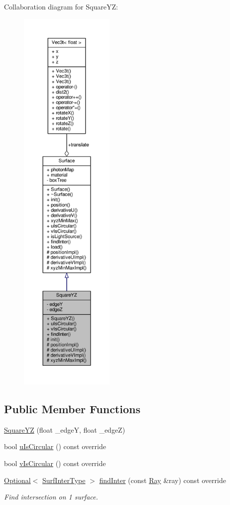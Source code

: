 Collaboration diagram for Square\+YZ\+:\nopagebreak
\begin{figure}[H]
\begin{center}
\leavevmode
\includegraphics[height=550pt]{classSquareYZ__coll__graph}
\end{center}
\end{figure}
\subsection*{Public Member Functions}
\begin{DoxyCompactItemize}
\item 
\hyperlink{classSquareYZ_a3d88bfd27f8d9a833a54ef3d2d885831}{Square\+YZ} (float \+\_\+edgeY, float \+\_\+edgeZ)
\item 
bool \hyperlink{classSquareYZ_adc74593250e7aaf7f8d733e22e3951b6}{u\+Is\+Circular} () const override
\item 
bool \hyperlink{classSquareYZ_ab6a94e65acedccedd4556023b1490841}{v\+Is\+Circular} () const override
\item 
\hyperlink{classOptional}{Optional}$<$ \hyperlink{structSurfInterType}{Surf\+Inter\+Type} $>$ \hyperlink{classSquareYZ_a75ffd1eda4c026706513dfa07043ffc8}{find\+Inter} (const \hyperlink{structRay}{Ray} \&ray) const override
\begin{DoxyCompactList}\small\item\em Find intersection on 1 surface. \end{DoxyCompactList}\end{DoxyCompactItemize}
